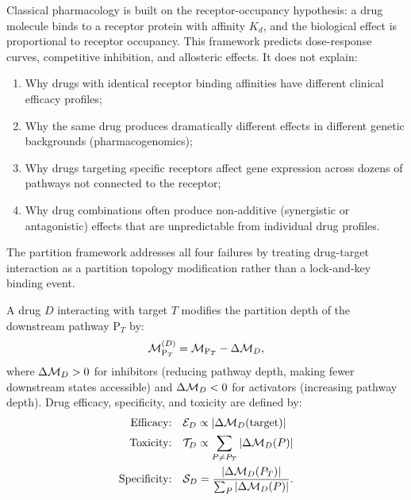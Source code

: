 Classical pharmacology is built on the receptor-occupancy hypothesis: a drug
molecule binds to a receptor protein with affinity $K_d$, and the biological
effect is proportional to receptor occupancy. This framework predicts dose-response
curves, competitive inhibition, and allosteric effects. It does not explain:
\begin{enumerate}[label=(\roman*)]
  \item Why drugs with identical receptor binding affinities have different
        clinical efficacy profiles;
  \item Why the same drug produces dramatically different effects in different
        genetic backgrounds (pharmacogenomics);
  \item Why drugs targeting specific receptors affect gene expression across
        dozens of pathways not connected to the receptor;
  \item Why drug combinations often produce non-additive (synergistic or
        antagonistic) effects that are unpredictable from individual drug profiles.
\end{enumerate}

The partition framework addresses all four failures by treating drug-target
interaction as a partition topology modification rather than a lock-and-key
binding event.

\begin{definition}
\label{def:drug_modifier}
A drug $D$ interacting with target $T$ modifies the partition depth of the
downstream pathway $\mathrm{P}_T$ by:
\begin{equation}
  \mathcal{M}_{\mathrm{P}_T}^{(D)} = \mathcal{M}_{\mathrm{P}_T} - \Delta\mathcal{M}_D,
  \label{eq:drug_depth}
\end{equation}
where $\Delta\mathcal{M}_D > 0$ for inhibitors (reducing pathway depth, making
fewer downstream states accessible) and $\Delta\mathcal{M}_D < 0$ for activators
(increasing pathway depth). Drug efficacy, specificity, and toxicity are
defined by:
\begin{align}
  \text{Efficacy:}   &\quad \mathcal{E}_D \propto |\Delta\mathcal{M}_D(\text{target})| \label{eq:efficacy} \\
  \text{Toxicity:}   &\quad \mathcal{T}_D \propto \sum_{P \neq P_T} |\Delta\mathcal{M}_D(P)| \label{eq:toxicity} \\
  \text{Specificity:}&\quad \mathcal{S}_D = \frac{|\Delta\mathcal{M}_D(P_T)|}{\sum_P |\Delta\mathcal{M}_D(P)|}. \label{eq:specificity}
\end{align}
\end{definition}

